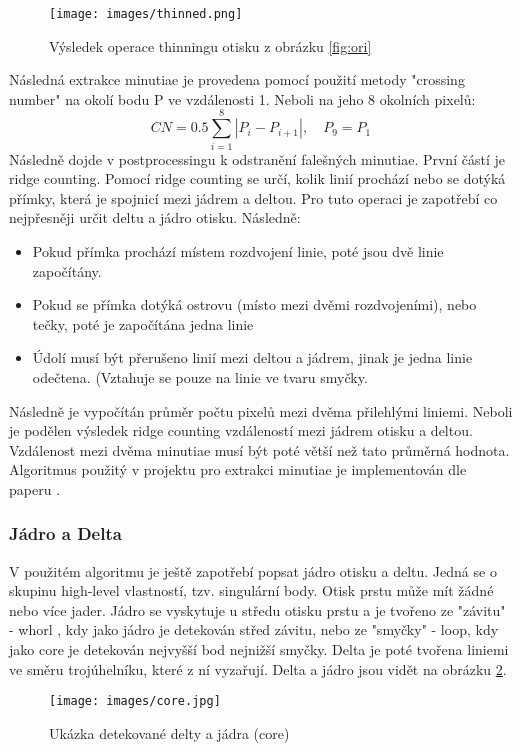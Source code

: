 \documentclass[a4paper,11pt]{article}
\begin{document}
\begin{multicols*}{2}
        \begin{figure}[H]
            \centering
                {\texttt{[image: images/thinned.png]}}\\
                \caption{Výsledek operace thinningu otisku z obrázku \ref{fig:ori}}
                \label{fig:thinning}
        \end{figure}
        
        Následná extrakce minutiae je provedena pomocí použití metody "crossing number" na okolí bodu P ve vzdálenosti 1. Neboli na jeho 8 okolních pixelů:
        \begin{equation}
            C N=0.5 \sum_{i=1}^{8}\left|P_{i}-P_{i+1}\right|, \quad P_{9}=P_{1}
        \end{equation}
        Následně dojde v postprocessingu k odstranění falešných minutiae. První částí je ridge counting. Pomocí ridge counting se určí, kolik linií prochází nebo se dotýká přímky, která je spojnicí mezi jádrem a deltou. Pro tuto operaci je zapotřebí co nejpřesněji určit deltu a jádro otisku. Následně:
        \begin{itemize}
            \item Pokud přímka prochází místem rozdvojení linie, poté jsou dvě linie započítány.
            \item Pokud se přímka dotýká ostrovu (místo mezi dvěmi rozdvojeními), nebo tečky, poté je započítána jedna linie
            \item Údolí musí být přerušeno linií mezi deltou a jádrem, jinak je jedna linie odečtena. (Vztahuje se pouze na linie ve tvaru smyčky.
        \end{itemize}
        
        Následně je vypočítán průměr počtu pixelů mezi dvěma přilehlými liniemi. Neboli je podělen výsledek ridge counting vzdáleností mezi jádrem otisku a deltou. Vzdálenost mezi dvěma minutiae musí být poté větší než tato průměrná hodnota. Algoritmus použitý v projektu pro extrakci minutiae je implementován dle paperu \cite{thinning}.
        
        \subsubsection{Jádro a Delta}
        V použitém algoritmu je ještě zapotřebí popsat jádro otisku a deltu. Jedná se o skupinu high-level vlastností, tzv. singulární body. Otisk prstu může mít žádné nebo více jader. Jádro se vyskytuje u středu otisku prstu a je tvořeno ze "závitu" - whorl , kdy jako jádro je detekován střed závitu, nebo ze "smyčky" - loop, kdy jako core je detekován nejvyšší bod nejnižší smyčky. Delta je poté tvořena liniemi ve směru trojúhelníku, které z ní vyzařují. Delta a jádro jsou vidět na obrázku \ref{fig:core}.
        \begin{figure}[H]
            \centering
                {\texttt{[image: images/core.jpg]}}\\
                \caption{Ukázka detekované delty a jádra (core) \cite{core}}
                \label{fig:core}
        \end{figure}
        

\end{multicols*}
\end{document}
